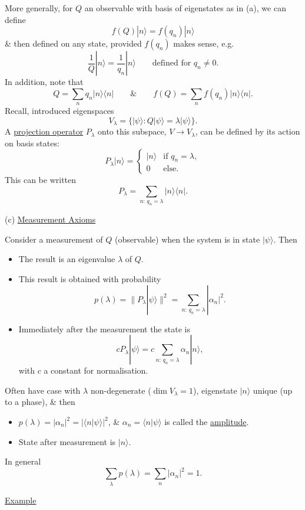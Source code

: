 \documentclass[11pt,a4paper]{article}
\begin{document}
More generally, for $Q$ an observable with basis of eigenstates as in (a),
we can define
\[
    f(Q)|n\rangle=f(q_n)|n\rangle
\]
\& then defined on any state, provided $f(q_n)$ makes sense, e.g.
\[
    \frac{1}{Q}|n\rangle=\frac{1}{q_n}|n\rangle
    \qquad\text{defined for }q_n\neq0.
\]
In addition, note that
\[
    Q=\sum_n q_n|n\rangle\langle n|
    \qquad\&\qquad
    f(Q)=\sum_n f(q_n)|n\rangle\langle n|.
\]
Recall, introduced eigenspaces
\[
    V_\lambda=\bigl\{|\psi\rangle:Q|\psi\rangle=\lambda|\psi\rangle\bigr\}.
\]
A \underline{projection operator} $P_\lambda$ onto this subspace,
$V\to V_\lambda$, can be defined by its action on basis states:
\[
    P_\lambda|n\rangle=
    \begin{cases}
        |n\rangle & \text{if }q_n=\lambda,\\
        0 & \text{else}.
    \end{cases}
\]
This can be written
\[
    P_\lambda=\sum_{n:\,q_n=\lambda}|n\rangle\langle n|.
\]

\medskip
\noindent
(c) \underline{Measurement Axioms}

Consider a measurement of $Q$ (observable) when the system is in state
$|\psi\rangle$. Then
\begin{itemize}
    \item The result is an eigenvalue $\lambda$ of $Q$.
    \item This result is obtained with probability
    \[
        p(\lambda)=\bigl\|P_\lambda|\psi\rangle\bigr\|^2
        =\sum_{n:\,q_n=\lambda}|\alpha_n|^2.
    \]
    \item Immediately after the measurement the state is
    \[
        cP_\lambda|\psi\rangle
        =c\sum_{n:\,q_n=\lambda}\alpha_n|n\rangle,
    \]
    with $c$ a constant for normalisation.
\end{itemize}

Often have case with $\lambda$ non-degenerate ($\dim V_\lambda=1$),
eigenstate $|n\rangle$ unique (up to a phase), \& then
\begin{itemize}
    \item $p(\lambda)=|\alpha_n|^2=|\langle n|\psi\rangle|^2$,
    \& $\alpha_n=\langle n|\psi\rangle$ is called the \underline{amplitude}.
    \item State after measurement is $|n\rangle$.
\end{itemize}
In general
\[
    \sum_\lambda p(\lambda)=\sum_n|\alpha_n|^2=1.
\]

\medskip
\noindent
\underline{Example}
\end{document}
